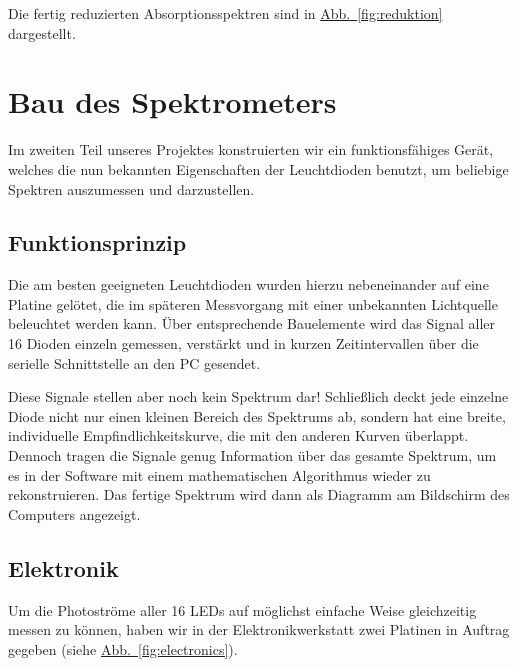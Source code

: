 \documentclass[11pt]{scrartcl}
\newcommand{\hypref}[2]{\hyperref[#2]{{#1}~\ref{#2}}}
\begin{document}
Die fertig reduzierten Absorptions\-spektren sind in \hypref{Abb.}{fig:reduktion} dargestellt.



\FloatBarrier
\section{Bau des Spektrometers}
Im zweiten Teil unseres Projektes konstruierten wir ein funktionsfähiges Gerät, welches die nun bekannten Eigenschaften der Leuchtdioden benutzt, um beliebige Spektren auszumessen und darzustellen.


\subsection{Funktionsprinzip} %
Die am besten geeigneten  Leuchtdioden wurden hierzu nebeneinander auf eine Platine gelötet, die im späteren Messvorgang mit einer unbekannten Lichtquelle beleuchtet werden kann.
Über entsprechende Bauelemente wird das Signal aller 16 Dioden einzeln gemessen, verstärkt und in kurzen Zeitintervallen über die serielle Schnittstelle an den PC gesendet.

Diese Signale stellen aber noch kein Spektrum dar! Schließlich deckt jede einzelne Diode nicht nur einen kleinen Bereich des Spektrums ab, sondern hat eine breite, individuelle Empfindlichkeitskurve, die mit den anderen Kurven überlappt.
Dennoch tragen die Signale genug Information über das gesamte Spektrum, um es in der Software mit einem mathematischen Algorithmus wieder zu rekonstruieren.
Das fertige Spektrum wird dann als Diagramm am Bildschirm des Computers angezeigt.


\subsection{Elektronik}

Um die Photoströme aller 16 LEDs auf möglichst einfache Weise gleichzeitig messen zu können, haben wir in der Elektronikwerkstatt zwei Platinen in Auftrag gegeben (siehe \hypref{Abb.}{fig:electronics}).
\end{document}
